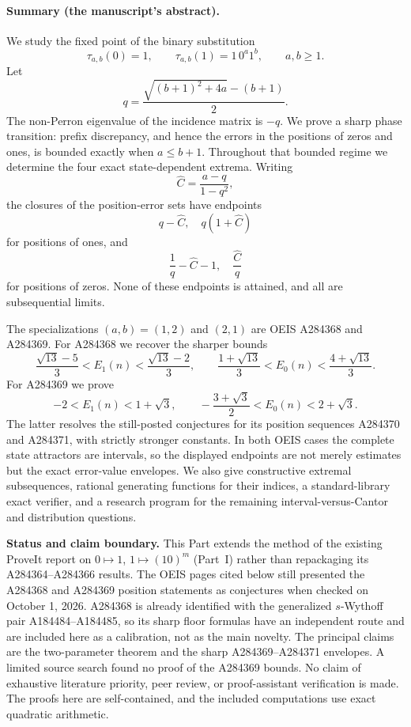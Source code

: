 \documentclass[11pt]{article}
\numberwithin{equation}{section}
\theoremstyle{definition}
\theoremstyle{remark}
\begin{document}
\paragraph{Summary (the manuscript's abstract).}
We study the fixed point of the binary substitution
\[
  \tau_{a,b}(0)=1,\qquad \tau_{a,b}(1)=1\,0^a1^b,
  \qquad a,b\geq1.
\]
Let
\[
q=\frac{\sqrt{(b+1)^2+4a}-(b+1)}2.
\]
The non-Perron eigenvalue of the incidence matrix is $-q$.  We prove a
sharp phase transition: prefix discrepancy, and hence the errors in the
positions of zeros and ones, is bounded exactly when $a\leq b+1$.
Throughout that bounded regime we determine the four exact state-dependent
extrema.  Writing
\[
 {\widehat C}=\frac{a-q}{1-q^2},
\]
the closures of the position-error sets have endpoints
\[
q-{\widehat C},\quad q(1+{\widehat C})
\]
for positions of ones, and
\[
\frac1q-{\widehat C}-1,\quad \frac{\widehat C}q
\]
for positions of zeros.  None of these endpoints is attained, and all are
subsequential limits.

The specializations $(a,b)=(1,2)$ and $(2,1)$ are OEIS A284368 and A284369.
For A284368 we recover the sharper bounds
\[
\frac{\sqrt{13}-5}{3}<E_1(n)<\frac{\sqrt{13}-2}{3},\qquad
\frac{1+\sqrt{13}}3<E_0(n)<\frac{4+\sqrt{13}}3.
\]
For A284369 we prove
\[
-2<E_1(n)<1+\sqrt3,\qquad
-\frac{3+\sqrt3}{2}<E_0(n)<2+\sqrt3.
\]
The latter resolves the still-posted conjectures for its position sequences
A284370 and A284371, with strictly stronger constants.  In both OEIS cases
the complete state attractors are intervals, so the displayed endpoints are
not merely estimates but the exact error-value envelopes.  We also give
constructive extremal subsequences, rational generating functions for their
indices, a standard-library exact verifier, and a research program for the
remaining interval-versus-Cantor and distribution questions.

\begin{statusbox}
\textbf{Status and claim boundary.}
This Part extends the method of the existing ProveIt report on
$0\mapsto1$, $1\mapsto(10)^m$ (Part~I) rather than repackaging its
A284364--A284366 results.  The OEIS pages cited below still presented the
A284368 and A284369 position statements as conjectures when checked on
October 1, 2026.  A284368 is already identified with the generalized
$s$-Wythoff pair A184484--A184485, so its sharp floor formulas have an
independent route and are included here as a calibration, not as the main
novelty.  The principal claims are the two-parameter theorem and the sharp
A284369--A284371 envelopes.  A limited source search found no proof of the
A284369 bounds.  No claim of exhaustive literature priority, peer review, or
proof-assistant verification is made.  The proofs here are self-contained,
and the included computations use exact quadratic arithmetic.
\end{statusbox}
\end{document}
